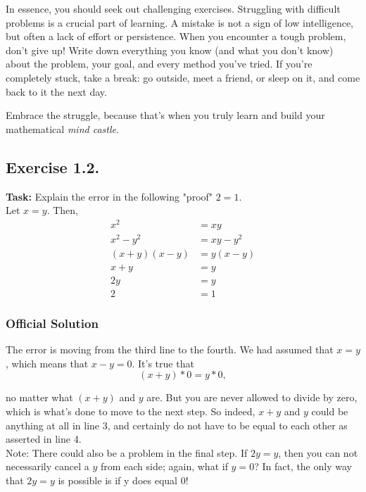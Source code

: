 \documentclass{article}
\begin{document}
\noindent In essence, you should seek out challenging exercises. Struggling with difficult problems is a crucial part of learning. A mistake is not a sign of low intelligence, but often a lack of effort or persistence. When you encounter a tough problem, don’t give up! Write down everything you know (and what you don’t know) about the problem, your goal, and every method you’ve tried. If you’re completely stuck, take a break: go outside, meet a friend, or sleep on it, and come back to it the next day.

Embrace the struggle, because that’s when you truly learn and build your mathematical \textit{mind castle}.

\newpage 

\subsection{Exercise 1.2.}
\textbf{Task:} Explain the error in the following "proof" $2 = 1$. \\ Let $x = y$. Then,\\
\begin{align*}
    x^2 &= xy \\
    x^2 - y^2 &= xy - y^2 \\
    (x + y)(x - y) &= y(x - y) \\
    x + y &= y \\
    2y &= y \\
    2 &= 1
\end{align*}

\subsubsection*{Official Solution}

The error is moving from the third line to the fourth. We had assumed that $x=y$, which means that $x-y=0$. It's true that
\[(x+y)*0=y*0,\]

no matter what $(x+y)$ and $y$ are. But you are never allowed to divide by zero, which is what's done to move to the next step. So indeed, $x+y$ and $y$ could be anything at all in line 3, and certainly do not have to be equal to each other as asserted in line 4.\\

Note: There could also be a problem in the final step. If $2y = y$, then you can not necessarily cancel a $y$
from each side; again, what if $y = 0$? In fact, the only way that $2y = y$ is possible is if y does equal $0$!
\end{document}
